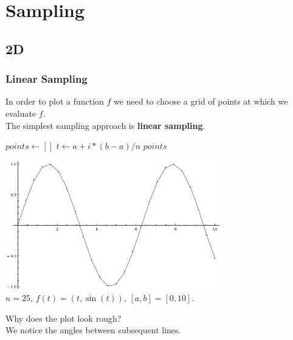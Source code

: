 \documentclass{beamer}
\begin{document}
\section{Sampling}
\subsection{2D}
\begin{frame}
\frametitle{Linear Sampling}
In order to plot a function $f$ we need to choose a grid of points at which we evaluate $f$. \\ \vspace{0.2cm}
The simplest sampling approach is {\bf linear sampling}. \vspace{0.5cm}
\footnotesize
\begin{algorithmic}[1]
\State $points \gets []$
\State $t \gets a + i * (b-a) / n$
\State {}
\EndFor
\State \Return $points$
\EndFunction
\end{algorithmic}%
\normalsize
\end{frame}


\begin{frame}
\begin{center}
  \includegraphics[width=0.7\textwidth]{sinlinear.png} \\
  $n = 25$, $f(t) = (t, \sin(t))$, $[a,b] = [0,10]$. \\ \vspace{0.2cm}
\end{center}
Why does the plot look rough?  \\ \vspace{0.2cm}
We notice the angles between subsequent lines.
\end{frame}
\end{document}
